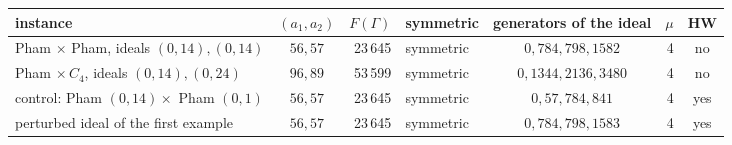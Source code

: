 \begin{tabular}{lcrlcrc}
\toprule
instance & $(a_1,a_2)$ & $F(\Gamma)$ & symmetric & generators of the ideal & $\mu$ & HW\\
\midrule
Pham $\times$ Pham, ideals $(0,14),(0,14)$ & $56,57$ & 23\,645 & symmetric & $0,784,798,1582$ & 4 & no \\
Pham $\times\,C_4$, ideals $(0,14),(0,24)$ & $96,89$ & 53\,599 & symmetric & $0,1344,2136,3480$ & 4 & no \\
control: Pham $(0,14)\times$ Pham $(0,1)$ & $56,57$ & 23\,645 & symmetric & $0,57,784,841$ & 4 & yes \\
perturbed ideal of the first example & $56,57$ & 23\,645 & symmetric & $0,784,798,1583$ & 4 & yes \\
\bottomrule
\end{tabular}

